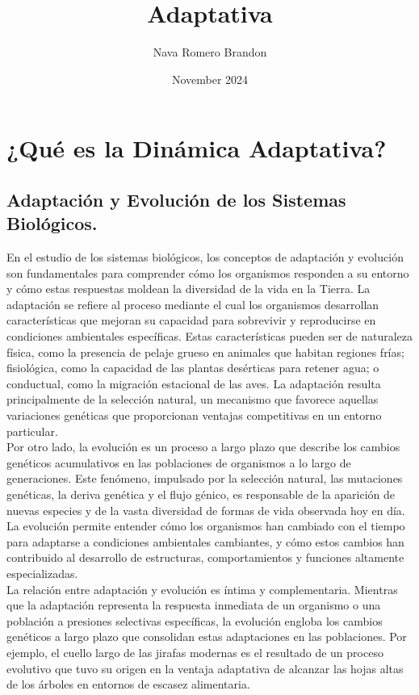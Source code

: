 \documentclass{article}
\title{Adaptativa}
\author{Nava Romero Brandon}
\date{November 2024}
\begin{document}
\maketitle

\section{¿Qué es la Dinámica Adaptativa?}{

        \subsection{Adaptación y Evolución de los Sistemas Biológicos.}{

            \normalsize{En el estudio de los sistemas biológicos, los conceptos de adaptación y evolución son fundamentales para comprender cómo los organismos responden a su entorno y cómo estas respuestas moldean la diversidad de la vida en la Tierra. \citep{adaptacion} La adaptación se refiere al proceso mediante el cual los organismos desarrollan características que mejoran su capacidad para sobrevivir y reproducirse en condiciones ambientales específicas. Estas características pueden ser de naturaleza física, como la presencia de pelaje grueso en animales que habitan regiones frías; fisiológica, como la capacidad de las plantas desérticas para retener agua; o conductual, como la migración estacional de las aves. La adaptación resulta principalmente de la selección natural, un mecanismo que favorece aquellas variaciones genéticas que proporcionan ventajas competitivas en un entorno particular.}\\

            \normalsize{\citep {evolucion} Por otro lado, la evolución es un proceso a largo plazo que describe los cambios genéticos acumulativos en las poblaciones de organismos a lo largo de generaciones. Este fenómeno, impulsado por la selección natural, las mutaciones genéticas, la deriva genética y el flujo génico, es responsable de la aparición de nuevas especies y de la vasta diversidad de formas de vida observada hoy en día. La evolución permite entender cómo los organismos han cambiado con el tiempo para adaptarse a condiciones ambientales cambiantes, y cómo estos cambios han contribuido al desarrollo de estructuras, comportamientos y funciones altamente especializadas.}\\

            \normalsize{La relación entre adaptación y evolución es íntima y complementaria. Mientras que la adaptación representa la respuesta inmediata de un organismo o una población a presiones selectivas específicas, la evolución engloba los cambios genéticos a largo plazo que consolidan estas adaptaciones en las poblaciones. Por ejemplo, el cuello largo de las jirafas modernas es el resultado de un proceso evolutivo que tuvo su origen en la ventaja adaptativa de alcanzar las hojas altas de los árboles en entornos de escasez alimentaria.}\\

}}
\end{document}
